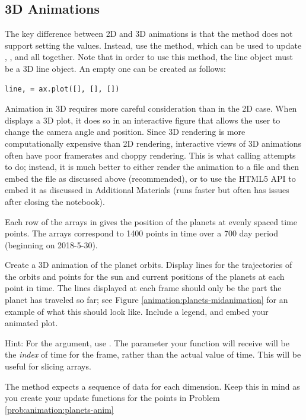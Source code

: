 \subsection*{3D Animations}
The key difference between 2D and 3D animations is that the  method does not support setting the  values.
Instead, use the  method, which can be used to update , , and  all together.
Note that in order to use this method, the line object must be a 3D line object.
An empty one can be created as follows:
\begin{lstlisting}
line, = ax.plot([], [], [])
\end{lstlisting}

Animation in 3D requires more careful consideration than in the 2D case.
When  displays a 3D plot, it does so in an interactive figure that allows the user to change the camera angle and position.
Since 3D rendering is more computationally expensive than 2D rendering, interactive views of 3D animations often have poor framerates and choppy rendering.
This is what calling  attempts to do; instead, it is much better to either render the animation to a file and then embed the file as discussed above (recommended), or to use the HTML5 API to embed it as discussed in Additional Materials (runs faster but often has issues after closing the notebook).

\begin{problem}
\label{prob:animation:planets-anim}
Each row of the arrays in  gives the position of the planets at evenly spaced time points. The arrays correspond to 1400 points in time over a 700 day period (beginning on 2018-5-30).

Create a 3D animation of the planet orbits.
Display lines for the trajectories of the orbits and points for the sun and current positions of the planets at each point in time.
The lines displayed at each frame should only be the part the planet has traveled so far; see Figure \ref{animation:planets-midanimation} for an example of what this should look like.
Include a legend, and embed your animated plot.

Hint: For the  argument, use .
The parameter your  function will receive will be the \emph{index} of time for the frame, rather than the actual value of time.
This will be useful for slicing arrays.
\end{problem}

\begin{warn}
The method  expects a sequence of data for each dimension. Keep this in mind as you create your update functions for the points in Problem \ref{prob:animation:planets-anim}
\end{warn}


